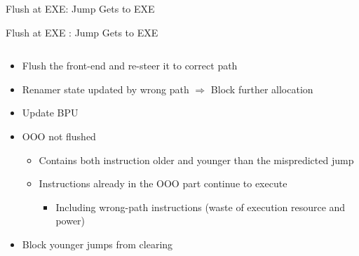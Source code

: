 \documentclass[aspectratio=169,12pt]{beamer}
\begin{document}
\begin{frame}{Flush at EXE: Jump Gets to EXE}
    \centering
    
    \vspace{4cm} %
\end{frame}

\begin{frame}{Flush at EXE : Jump Gets to EXE}
    \centering
    
    
    \vspace{0.5cm}
    \begin{columns}[T]
        \begin{column}{0.9\textwidth}
            \begin{itemize}
                \item Flush the front-end and re-steer it to correct path
                \item Renamer state updated by wrong path $\Rightarrow$ Block further allocation
                \item Update BPU
                \item OOO not flushed
                \begin{itemize}
                    \item Contains both instruction older and younger than the mispredicted jump
                    \item Instructions already in the OOO part continue to execute
                    \begin{itemize}
                        \item Including wrong-path instructions (waste of execution resource and power)
                    \end{itemize}
                \end{itemize}
                \item Block younger jumps from clearing
            \end{itemize}
        \end{column}
    \end{columns}
\end{frame}
\end{document}
